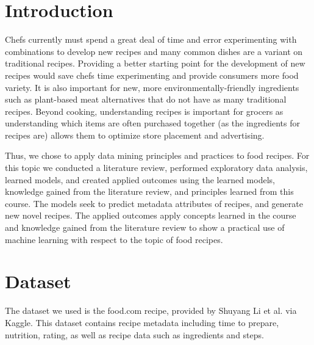 \documentclass[sigconf]{acmart}
\begin{document}

\maketitle

\section{Introduction}
Chefs currently must spend a great deal of time and error experimenting with combinations to develop new recipes and many common dishes are a variant on traditional recipes. Providing a better starting point for the development of new recipes would save chefs time experimenting and provide consumers more food variety. It is also important for new, more environmentally-friendly ingredients such as plant-based meat alternatives that do not have as many traditional recipes. Beyond cooking, understanding recipes is important for grocers as understanding which items are often purchased together (as the ingredients for recipes are) allows them to optimize store placement and advertising.

Thus, we chose to apply data mining principles and practices to food recipes. For this topic we conducted a literature review, performed exploratory data analysis, learned models, and created applied outcomes using the learned models, knowledge gained from the literature review, and principles learned from this course. The models seek to predict metadata attributes of recipes, and generate new novel recipes. The applied outcomes apply concepts learned in the course and knowledge gained from the literature review to show a practical use of machine learning with respect to the topic of food recipes.

\section{Dataset}
The dataset we used is the food.com recipe\cite{FoodComRecipe}, provided by Shuyang Li et al. via Kaggle. This dataset contains recipe metadata including time to prepare, nutrition, rating, as well as recipe data such as ingredients and steps.
\end{document}
